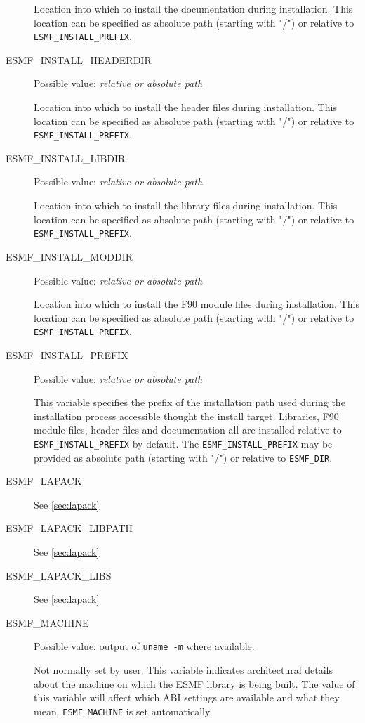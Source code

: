 \begin{description}
Location into which to install the documentation during installation. This
location can be specified as absolute path (starting with "/") or relative to
{\tt ESMF\_INSTALL\_PREFIX}.

\item[ESMF\_INSTALL\_HEADERDIR]
Possible value: {\em relative or absolute path}

Location into which to install the header files during installation. This
location can be specified as absolute path (starting with "/") or relative to
{\tt ESMF\_INSTALL\_PREFIX}.

\item[ESMF\_INSTALL\_LIBDIR]
Possible value: {\em relative or absolute path}

Location into which to install the library files during installation. This
location can be specified as absolute path (starting with "/") or relative to
{\tt ESMF\_INSTALL\_PREFIX}.

\item[ESMF\_INSTALL\_MODDIR]
Possible value: {\em relative or absolute path}

Location into which to install the F90 module files during installation. This
location can be specified as absolute path (starting with "/") or relative to
{\tt ESMF\_INSTALL\_PREFIX}.

\item[ESMF\_INSTALL\_PREFIX]
Possible value: {\em relative or absolute path}

This variable specifies the prefix of the installation path used during the
installation process accessible thought the install target. Libraries, F90
module files, header files and documentation all are installed relative to
{\tt ESMF\_INSTALL\_PREFIX} by default. The {\tt ESMF\_INSTALL\_PREFIX} may be
provided as absolute path (starting with "/") or relative to {\tt ESMF\_DIR}.

\item[ESMF\_LAPACK]
See \ref{sec:lapack}

\item[ESMF\_LAPACK\_LIBPATH]
See \ref{sec:lapack}

\item[ESMF\_LAPACK\_LIBS]
See \ref{sec:lapack}

\item[ESMF\_MACHINE]
Possible value: output of {\tt uname -m} where available.

Not normally set by user. This variable indicates architectural details about
the machine on which the ESMF library is being built. The value of this 
variable will affect which ABI settings are available and what they mean. 
{\tt ESMF\_MACHINE} is set automatically.


\end{description}
